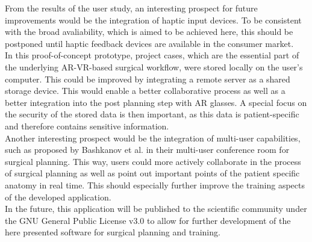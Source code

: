 From the results of the user study, an interesting prospect for
future improvements would be the integration of 
haptic input devices. 
To be consistent with the broad avaliability, which is
aimed to be achieved here, this should be postponed
until haptic feedback devices are available
in the consumer market. 
\\ In this proof-of-concept prototype, project
cases, which are the essential part of the underlying AR-VR-based
surgical workflow, were stored locally on the user's 
computer. This could be improved by integrating a remote server as 
a shared storage device. 
This would enable a better collaborative process as well as a 
better integration into the post planning step with AR glasses.
A special focus on the security of the stored data is then 
important, as this data is patient-specific and therefore 
contains sensitive information.
\\ Another interesting prospect would be the integration of multi-user
capabilities, such as proposed by Bashkanov et al. \cite{RN43} in their
multi-user conference room for surgical planning. 
This way, users could more actively collaborate in the process 
of surgical planning as well as point out 
important points of the patient specific anatomy in real time.
This should especially further improve the training aspects of 
the developed application. 
\\ In the future, this application will be published to the 
scientific community under the GNU General Public License v3.0 \cite{gpl}
to allow for further 
development of the here presented software for surgical planning 
and training. 